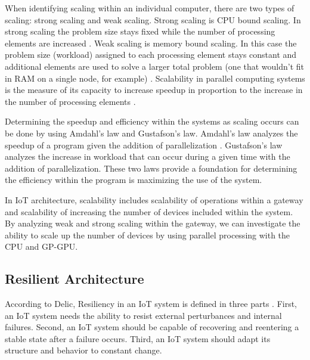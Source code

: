 \documentclass[../main.tex]{subfiles}
\begin{document}
When identifying scaling within an individual computer, there are two types of scaling: strong scaling and weak scaling. Strong scaling is CPU bound scaling. In strong scaling the problem size stays fixed while the number of processing elements are increased \cite{scaling}. Weak scaling is memory bound scaling. In this case the problem size (workload) assigned to each processing element stays constant and additional elements are used to solve a larger total problem (one that wouldn't fit in RAM on a single node, for example) \cite{scaling}. Scalability in parallel computing systems is the measure of its capacity to increase speedup in proportion to the increase in the number of processing elements \cite{parallel_computing}. 

Determining the speedup and efficiency within the systems as scaling occurs can be done by using Amdahl's law and Gustafson's law. Amdahl's law analyzes the speedup of a program given the addition of parallelization \cite{dr-dobbs}. Gustafson's law analyzes the increase in workload that can occur during a given time with the addition of parallelization. These two laws provide a foundation for determining the efficiency within the program is maximizing the use of the system. 


In IoT architecture, scalability includes scalability of operations within a gateway and scalability of increasing the number of devices included within the system. By analyzing weak and strong scaling within the gateway, we can investigate the ability to scale up the number of devices by using parallel processing with the CPU and GP-GPU. 

\subsection{Resilient Architecture}

According to Delic, Resiliency in an IoT system is defined in three parts \cite{Delic:2016:RIS:2891279.2822885}. First, an IoT system needs the ability to resist external perturbances and internal failures. Second, an IoT system should be capable of recovering and reentering a stable state after a failure occurs. Third, an IoT system should adapt its structure and behavior to constant change. 


\end{document}
